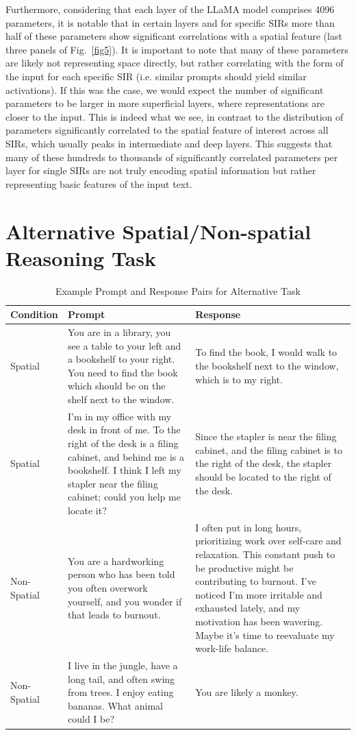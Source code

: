 \documentclass[runningheads]{llncs}
\begin{document}
Furthermore, considering that each layer of the LLaMA model comprises 4096 parameters, it is notable that in certain layers and for specific SIRs more than half of these parameters show significant correlations with a spatial feature (last three panels of Fig.~\ref{fig5}). It is important to note that many of these parameters are likely not representing space directly, but rather correlating with the form of the input for each specific SIR (i.e. similar prompts should yield similar activations). If this was the case, we would expect the number of significant parameters to be larger in more superficial layers, where representations are closer to the input. This is indeed what we see, in contrast to the distribution of parameters significantly correlated to the spatial feature of interest across all SIRs, which usually peaks in intermediate and deep layers. This suggests that many of these hundreds to thousands of significantly correlated parameters per layer for single SIRs are not truly encoding spatial information but rather representing basic features of the input text.


\section{Alternative Spatial/Non-spatial Reasoning Task}

\begin{table}[!t]
\caption{Example Prompt and Response Pairs for Alternative Task}\label{tab:prompts_responses}
\centering
\setlength{\tabcolsep}{4pt}
\renewcommand{\arraystretch}{1.1}
\begin{tabularx}{\linewidth}{|l|X|X|}
\hline
Condition & Prompt & Response \\ \hline
Spatial & You are in a library, you see a table to your left and a bookshelf to your right. You need to find the book which should be on the shelf next to the window. & To find the book, I would walk to the bookshelf next to the window, which is to my right. \\ \hline
Spatial & I'm in my office with my desk in front of me. To the right of the desk is a filing cabinet, and behind me is a bookshelf. I think I left my stapler near the filing cabinet; could you help me locate it? & Since the stapler is near the filing cabinet, and the filing cabinet is to the right of the desk, the stapler should be located to the right of the desk. \\ \hline
Non-Spatial & You are a hardworking person who has been told you often overwork yourself, and you wonder if that leads to burnout. & I often put in long hours, prioritizing work over self-care and relaxation. This constant push to be productive might be contributing to burnout. I've noticed I'm more irritable and exhausted lately, and my motivation has been wavering. Maybe it's time to reevaluate my work-life balance. \\ \hline
Non-Spatial & I live in the jungle, have a long tail, and often swing from trees. I enjoy eating bananas. What animal could I be? & You are likely a monkey. \\ \hline
\end{tabularx}
\label{tab4}
\end{table}
\end{document}
